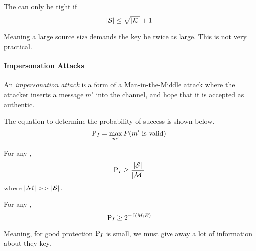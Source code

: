 \begin{theorem}\label{thm:Prob_Deception_Square_Root_Bound_Tightness}
  The  can only be tight if
  \begin{equation}\label{eq:10}
    \lvert \operatorname{\mathcal{S}} \rvert \leq \sqrt{\lvert \operatorname{\mathcal{K}} \rvert} + 1
  \end{equation}

  Meaning a large source size demands the key be twice as large.
  This is not very practical.
\end{theorem}

\paragraph{Impersonation Attacks}\label{par:Attack_Authentication_Code-Impersonation}
\begin{definition}\label{def:Attack_Authentication_Code-Impersonation}
  An \emph{impersonation attack} is a form of a Man-in-the-Middle attack where the attacker inserts a message $m'$ into the channel, and hope that it is accepted as authentic.

  The equation to determine the probability of success is shown below.
  \begin{equation}\label{eq:Attack_Authentication_Code-Impersonation-Success}
    \operatorname{\operatorname{P}}_{I} = \max_{m'} P(m' \text{ is valid})
  \end{equation}
\end{definition}

\begin{theorem}\label{thm:Attack_Authentication_Code-Impersonation-Success_Bounds}
  For any ,
  \begin{equation}\label{eq:Attack_Authentication_Code-Impersonation-Success_Bound}
    \operatorname{\operatorname{P}}_{I} \geq \frac{\lvert \operatorname{\mathcal{S}} \rvert}{\lvert \operatorname{\mathcal{M}} \rvert}
  \end{equation}
  where $\lvert \operatorname{\mathcal{M}} \rvert >> \lvert \operatorname{\mathcal{S}} \rvert$.
\end{theorem}

\begin{theorem}\label{thm:Impersonation-Simmons_Bound}
  For any ,
  \begin{equation}\label{eq:Impersonation-Simmons_Bound}
    \operatorname{\operatorname{P}}_{I} \geq 2^{-\operatorname{\operatorname{I}}(M; E)}
  \end{equation}

  Meaning, for good protection $\operatorname{\operatorname{P}}_{I}$ is small, we must give away a lot of information about they key.
\end{theorem}

